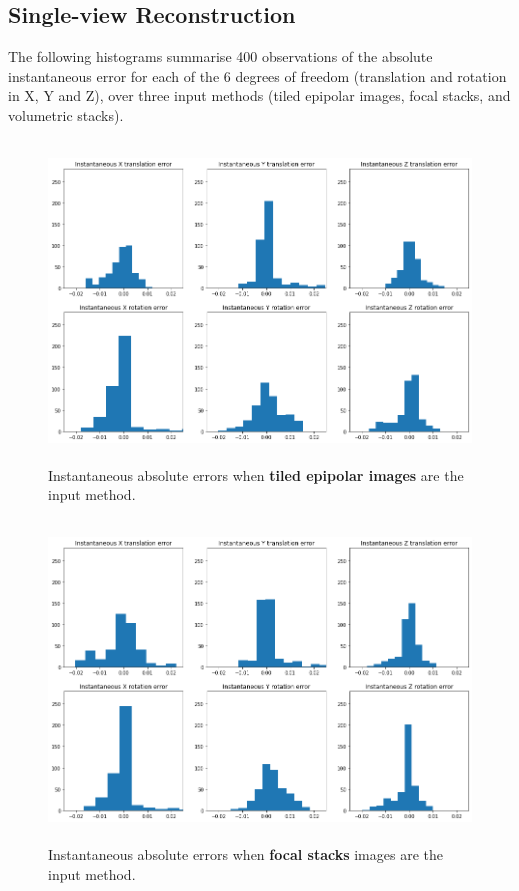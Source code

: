 \subsection{Single-view Reconstruction}

The following histograms summarise 400 observations of the absolute instantaneous error for each of the 6 degrees of freedom (translation and rotation in X, Y and Z), over three input methods (tiled epipolar images, focal stacks, and volumetric stacks).

\begin{figure}[H]
    \centering
    \includegraphics[width=\textwidth, height=3.35in]{images/result-examples/pose/errors/singlewarp-epi.png}
    \caption{Instantaneous absolute errors when \textbf{tiled epipolar images} are the input method.}
\end{figure}

\begin{figure}[H]
    \centering
    \includegraphics[width=\textwidth, height=3.35in]{images/result-examples/pose/errors/singlewarp-focalstack-17-5.png}
    \caption{Instantaneous absolute errors when \textbf{focal stacks} images are the input method.}
\end{figure}


